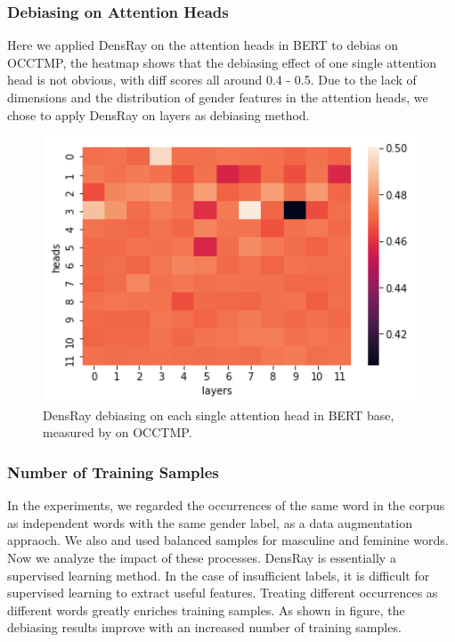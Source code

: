 \subsubsection{Debiasing on Attention Heads}
Here we applied DensRay on the attention heads in BERT to debias on OCCTMP, the heatmap  shows that the debiasing effect of one single attention head is not obvious, with diff scores all around 0.4 - 0.5. Due to the lack of dimensions and the distribution of gender features in the attention heads, we chose to apply DensRay on layers as debiasing method.
\begin{figure}[ht]
	\centering
	\includegraphics[width=0.9\linewidth]{heatmap_heads}
	\caption{DensRay debiasing on each single attention head in BERT base, measured by  on OCCTMP.}
\end{figure}


\subsubsection{Number of Training Samples}
In the experiments, we regarded the occurrences of the same word in the corpus as independent words with the same gender label, as a data augmentation appraoch. We also and used balanced samples for masculine and feminine words. Now we analyze the impact of these processes.
DensRay is essentially a supervised learning method. In the case of insufficient labels, it is difficult for supervised learning to extract useful features. Treating different occurrences as different words greatly enriches training samples. As shown in figure, the debiasing results improve with an increased number of training samples.

